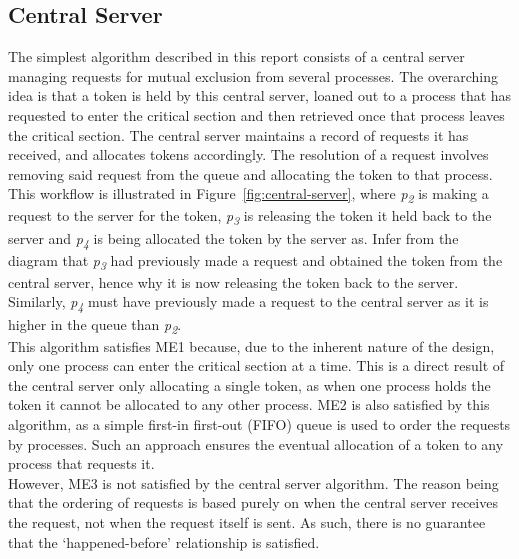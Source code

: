 \documentclass[conference]{IEEEtran}
\begin{document}
\subsection{Central Server}
The simplest algorithm described in this report consists of a central server
managing requests for mutual exclusion from several processes. The overarching
idea is that a token is held by this central server, loaned out to a process
that has requested to enter the critical section and then retrieved once that
process leaves the critical section. The central server maintains a record of
requests it has received, and allocates tokens accordingly. The resolution of
a request involves removing said request from the queue and allocating the
token to that process. This workflow is illustrated in
Figure~\ref{fig:central-server}, where \textit{p\textsubscript{2}} is making
a request to the server for the token, \textit{p\textsubscript{3}} is releasing the token
it held back to the server and \textit{p\textsubscript{4}} is being allocated
the token by the server as. Infer from the diagram that
\textit{p\textsubscript{3}} had previously made a request and obtained the
token from the central server, hence why it is now releasing the token back to the
server. Similarly, \textit{p\textsubscript{4}} must have previously made
a request to the central server as it is higher in the queue than
\textit{p\textsubscript{2}}. \\
This algorithm satisfies ME1 because, due to the inherent nature of the design,
only one process can enter the critical section at a time. This is a direct
result of the central server only allocating a single token, as when one
process holds the token it cannot be allocated to any other process. ME2 is
also satisfied by this algorithm, as a simple first-in first-out (FIFO) queue
is used to order the requests by processes. Such an approach ensures the
eventual allocation of a token to any process that requests it. \\
However, ME3 is not satisfied by the central server algorithm. The reason being
that the ordering of requests is based purely on when the central server
receives the request, not when the request itself is sent. As such, there is no
guarantee that the `happened-before' relationship is satisfied.
\end{document}
